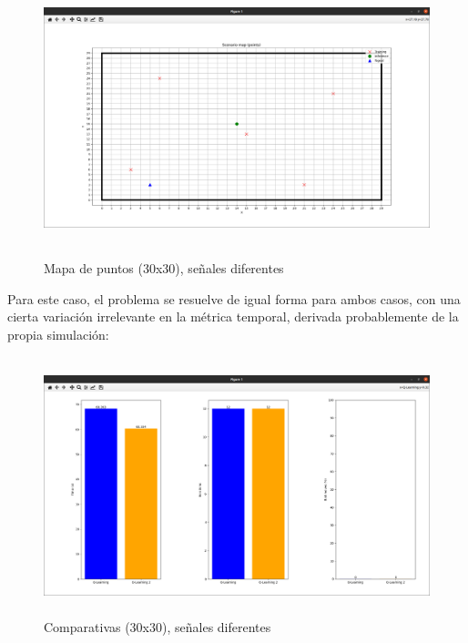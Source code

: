 \begin{figure} [H]
    \begin{center}
    \includegraphics[height=8cm]{imagenes/cap4/25_mapa_p_diff.png}
    \end{center}
    \caption[Mapa de puntos (30x30), señales diferentes]{Mapa de puntos (30x30), señales diferentes}
    \label{fig:map_p_diff_30}
\end{figure}

Para este caso, el problema se resuelve de igual forma para ambos casos, con una cierta variación irrelevante en la métrica temporal, derivada probablemente de la propia simulación:\\

\begin{figure} [H]
    \begin{center}
    \includegraphics[height=7.5cm]{imagenes/cap4/26_comp_diff.png}
    \end{center}
    \caption[Comparativas (30x30), señales diferentes]{Comparativas (30x30), señales diferentes}
    \label{fig:comp_diff_30}
\end{figure}

